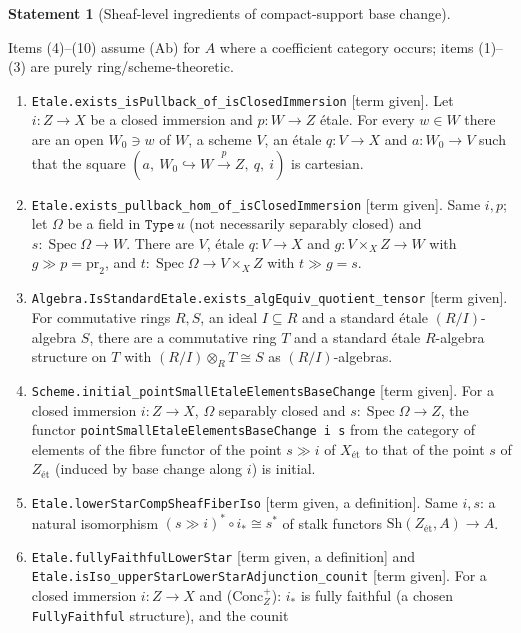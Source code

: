 \documentclass[10pt]{article}
\theoremstyle{definition}
\newtheorem{statement}[definition]{Statement}
\theoremstyle{remark}
\newcommand{\lean}[1]{{\small\nolinkurl{#1}}}
\newcommand{\leanu}[1]{{\small\texttt{#1}}}
\newcommand{\PROVED}{\textcolor{green!40!black}{term given}}
\newcommand{\DEF}{definition}
\newcommand{\et}{\text{\'et}}
\newcommand{\Sh}[2]{\mathrm{Sh}({#1}_{\et},#2)}
\newcommand{\Spec}{\operatorname{Spec}}
\begin{document}
\begin{statement}[Sheaf-level ingredients of compact-support base change]\label{st:cbc-sheaf}
\par{}\smallskip
Items (4)--(10) assume (Ab) for $A$ where a coefficient category occurs; items (1)--(3) are purely ring/scheme-theoretic.
\begin{enumerate}
\item \lean{Etale.exists_isPullback_of_isClosedImmersion} [\PROVED]. Let $i:Z\to X$ be a closed
immersion and $p:W\to Z$ étale. For every $w\in W$ there are an open $W_0\ni w$ of $W$, a scheme
$V$, an étale $q:V\to X$ and $a:W_0\to V$ such that the square $(a,\ W_0\hookrightarrow W\xrightarrow{p}Z,\ q,\ i)$
is cartesian.
\item \lean{Etale.exists_pullback_hom_of_isClosedImmersion} [\PROVED]. Same $i,p$; let $\Omega$ be a
field in $\mathtt{Type}\,u$ (not necessarily separably closed) and $s:\Spec\Omega\to W$. There are
$V$, étale $q:V\to X$ and $g:V\times_XZ\to W$ with $g\gg p=\mathrm{pr}_2$, and
$t:\Spec\Omega\to V\times_XZ$ with $t\gg g=s$.
\item \lean{Algebra.IsStandardEtale.exists_algEquiv_quotient_tensor} [\PROVED]. For commutative rings
$R,S$, an ideal $I\subseteq R$ and a standard étale $(R/I)$-algebra $S$, there are a commutative ring $T$
and a standard étale $R$-algebra structure on $T$ with $(R/I)\otimes_RT\cong S$ as $(R/I)$-algebras.
\item \lean{Scheme.initial_pointSmallEtaleElementsBaseChange} [\PROVED]. For a closed immersion
$i:Z\to X$, $\Omega$ separably closed and $s:\Spec\Omega\to Z$, the functor
\leanu{pointSmallEtaleElementsBaseChange i s} from the category of elements of the fibre functor
of the point $s\gg i$ of $X_{\et}$ to that of the point $s$ of $Z_{\et}$ (induced by base change
along $i$) is initial.
\item \lean{Etale.lowerStarCompSheafFiberIso} [\PROVED, a \DEF]. Same $i,s$: a natural isomorphism
$(s\gg i)^*\circ i_*\cong s^*$ of stalk functors $\Sh{Z}{A}\to A$.
\item \lean{Etale.fullyFaithfulLowerStar} [\PROVED, a \DEF] and
\lean{Etale.isIso_upperStarLowerStarAdjunction_counit} [\PROVED]. For a closed immersion $i:Z\to X$
and (Conc$^+_Z$): $i_*$ is fully faithful (a chosen \lean{FullyFaithful} structure), and the counit

\end{enumerate}
\end{statement}
\end{document}
